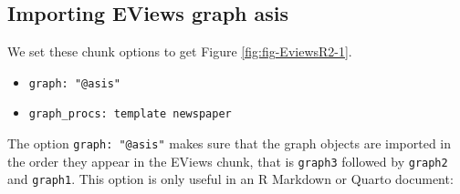 \hypertarget{importing-eviews-graph-asis}{%
\subsection{Importing EViews graph asis}\label{importing-eviews-graph-asis}}

\color{black}

We set these chunk options to get Figure \ref{fig:fig-EviewsR2-1}.

\begin{itemize}
\item
  \texttt{graph:\ "@asis"}
\item
  \texttt{graph\_procs:\ template\ newspaper}
\end{itemize}

The option \texttt{graph:\ "@asis"} makes sure that the graph objects are imported in the order they appear in the EViews chunk, that is \texttt{graph3} followed by \texttt{graph2} and \texttt{graph1}. This option is only useful in an R Markdown or Quarto document:

